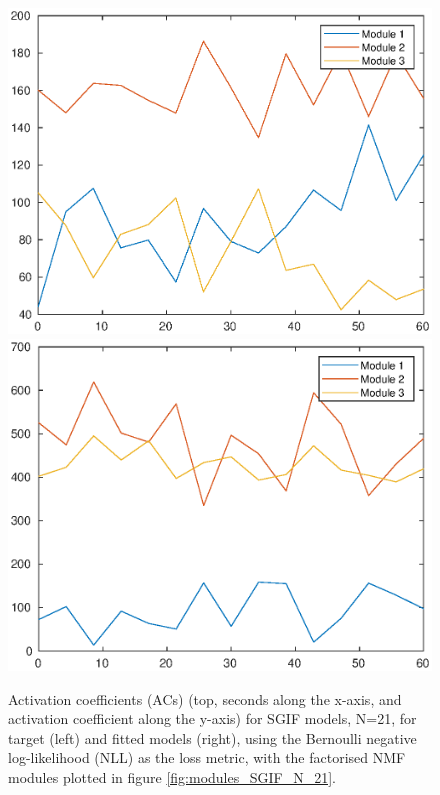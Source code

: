 \documentclass[mphil,deptreport,ianc]{infthesis} %
\begin{document}
\begin{figure}
    \includegraphics[width=0.49\columnwidth]{figures/matlab/NMF/ACs_target_GT_model_microGIF_N_21.eps}
    \includegraphics[width=0.49\columnwidth]{figures/matlab/NMF/ACs_nuovo_synthetic_v2_spikes_mt_microGIF_lfn_bernoulli_nll_euid_01-01_15-56-11-305.eps}
    \caption{Activation coefficients (ACs) (top, seconds along the x-axis, and activation coefficient along the y-axis) for SGIF models, N=21, for target (left) and fitted models (right), using the Bernoulli negative log-likelihood (NLL) as the loss metric, with the factorised NMF modules plotted in figure \ref{fig:modules_SGIF_N_21}.}
    \label{fig:ACs_SGIF_N_21}
\end{figure}
\end{document}
